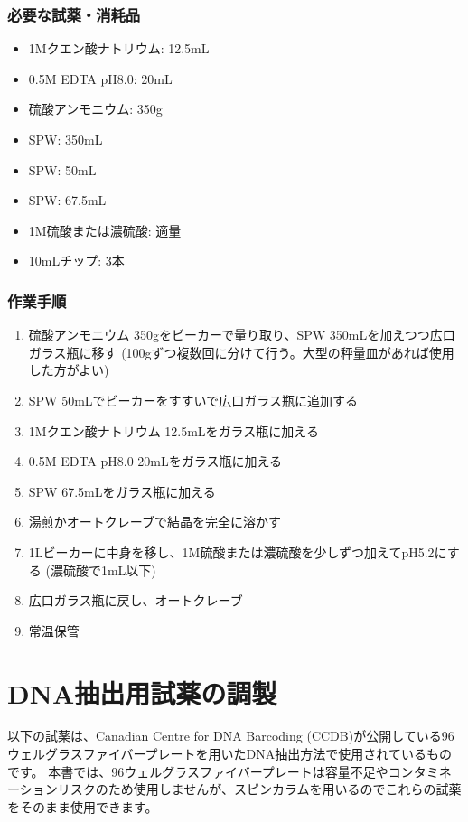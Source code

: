 \documentclass[titlepage,10pt,a4paper]{jsbook}
\begin{document}
\subsubsection{必要な試薬・消耗品}
\begin{itemize}
\item 1Mクエン酸ナトリウム: 12.5mL
\item 0.5M EDTA pH8.0: 20mL
\item 硫酸アンモニウム: 350g
\item SPW: 350mL
\item SPW: 50mL
\item SPW: 67.5mL
\item 1M硫酸または濃硫酸: 適量
\item 10mLチップ: 3本
\end{itemize}

\subsubsection{作業手順}
\begin{enumerate}
\item 硫酸アンモニウム 350gをビーカーで量り取り、SPW 350mLを加えつつ広口ガラス瓶に移す (100gずつ複数回に分けて行う。大型の秤量皿があれば使用した方がよい)
\item SPW 50mLでビーカーをすすいで広口ガラス瓶に追加する
\item 1Mクエン酸ナトリウム 12.5mLをガラス瓶に加える
\item 0.5M EDTA pH8.0 20mLをガラス瓶に加える
\item SPW 67.5mLをガラス瓶に加える
\item 湯煎かオートクレーブで結晶を完全に溶かす
\item 1Lビーカーに中身を移し、1M硫酸または濃硫酸を少しずつ加えてpH5.2にする (濃硫酸で1mL以下)
\item 広口ガラス瓶に戻し、オートクレーブ
\item 常温保管
\end{enumerate}

\section{DNA抽出用試薬の調製}\label{makingDNAextractionbuffers}

以下の試薬は、Canadian Centre for DNA Barcoding (CCDB)が公開している96ウェルグラスファイバープレートを用いたDNA抽出方法\citep{Ivanova2006}で使用されているものです。
本書では、96ウェルグラスファイバープレートは容量不足やコンタミネーションリスクのため使用しませんが、スピンカラムを用いるのでこれらの試薬をそのまま使用できます。
\end{document}
